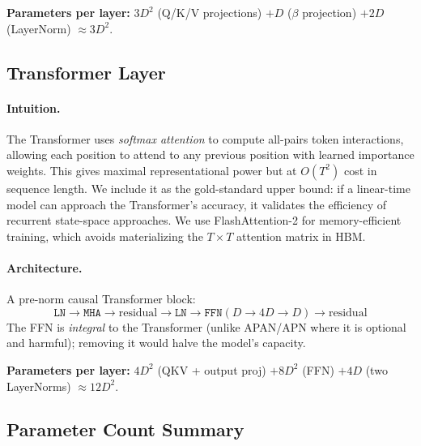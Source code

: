 \documentclass[11pt,a4paper]{article}
\begin{document}
\textbf{Parameters per layer:} $3D^2$ (Q/K/V projections) $+ D$ ($\beta$ projection) $+ 2D$ (LayerNorm) $\approx 3D^2$.

\subsection{Transformer Layer}

\paragraph{Intuition.}
The Transformer uses \emph{softmax attention} to compute all-pairs token interactions, allowing each position to attend to any previous position with learned importance weights.
This gives maximal representational power but at $O(T^2)$ cost in sequence length.
We include it as the gold-standard upper bound: if a linear-time model can approach the Transformer's accuracy, it validates the efficiency of recurrent state-space approaches.
We use FlashAttention-2 for memory-efficient training, which avoids materializing the $T \times T$ attention matrix in HBM.

\paragraph{Architecture.}
A pre-norm causal Transformer block:
\[
\texttt{LN} \to \texttt{MHA} \to \text{residual} \to \texttt{LN} \to \texttt{FFN}(D \to 4D \to D) \to \text{residual}
\]
The FFN is \emph{integral} to the Transformer (unlike APAN/APN where it is optional and harmful); removing it would halve the model's capacity.

\textbf{Parameters per layer:} $4D^2$ (QKV + output proj) $+ 8D^2$ (FFN) $+ 4D$ (two LayerNorms) $\approx 12D^2$.

\subsection{Parameter Count Summary}
\end{document}
